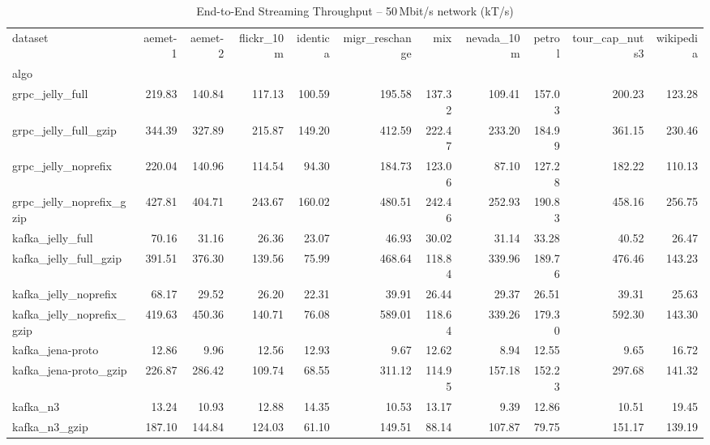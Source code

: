 \begin{table}[h!]
\small
\centering
\caption{End-to-End Streaming Throughput -- 50\,Mbit/s network (kT/s)}
\begin{tabular}{lrrrrrrrrrr}
\toprule
dataset &  aemet-1 &  aemet-2 &  flickr\_10m &  identica &  migr\_reschange &    mix &  nevada\_10m &  petrol &  tour\_cap\_nuts3 &  wikipedia \\
algo                      &          &          &             &           &                 &        &             &         &                 &            \\
\midrule
grpc\_jelly\_full           &   219.83 &   140.84 &      117.13 &    100.59 &          195.58 & 137.32 &      109.41 &  157.03 &          200.23 &     123.28 \\
grpc\_jelly\_full\_gzip      &   344.39 &   327.89 &      215.87 &    149.20 &          412.59 & 222.47 &      233.20 &  184.99 &          361.15 &     230.46 \\
grpc\_jelly\_noprefix       &   220.04 &   140.96 &      114.54 &     94.30 &          184.73 & 123.06 &       87.10 &  127.28 &          182.22 &     110.13 \\
grpc\_jelly\_noprefix\_gzip  &   427.81 &   404.71 &      243.67 &    160.02 &          480.51 & 242.46 &      252.93 &  190.83 &          458.16 &     256.75 \\
kafka\_jelly\_full          &    70.16 &    31.16 &       26.36 &     23.07 &           46.93 &  30.02 &       31.14 &   33.28 &           40.52 &      26.47 \\
kafka\_jelly\_full\_gzip     &   391.51 &   376.30 &      139.56 &     75.99 &          468.64 & 118.84 &      339.96 &  189.76 &          476.46 &     143.23 \\
kafka\_jelly\_noprefix      &    68.17 &    29.52 &       26.20 &     22.31 &           39.91 &  26.44 &       29.37 &   26.51 &           39.31 &      25.63 \\
kafka\_jelly\_noprefix\_gzip &   419.63 &   450.36 &      140.71 &     76.08 &          589.01 & 118.64 &      339.26 &  179.30 &          592.30 &     143.30 \\
kafka\_jena-proto          &    12.86 &     9.96 &       12.56 &     12.93 &            9.67 &  12.62 &        8.94 &   12.55 &            9.65 &      16.72 \\
kafka\_jena-proto\_gzip     &   226.87 &   286.42 &      109.74 &     68.55 &          311.12 & 114.95 &      157.18 &  152.23 &          297.68 &     141.32 \\
kafka\_n3                  &    13.24 &    10.93 &       12.88 &     14.35 &           10.53 &  13.17 &        9.39 &   12.86 &           10.51 &      19.45 \\
kafka\_n3\_gzip             &   187.10 &   144.84 &      124.03 &     61.10 &          149.51 &  88.14 &      107.87 &   79.75 &          151.17 &     139.19 \\
\bottomrule
\end{tabular}
\end{table}
